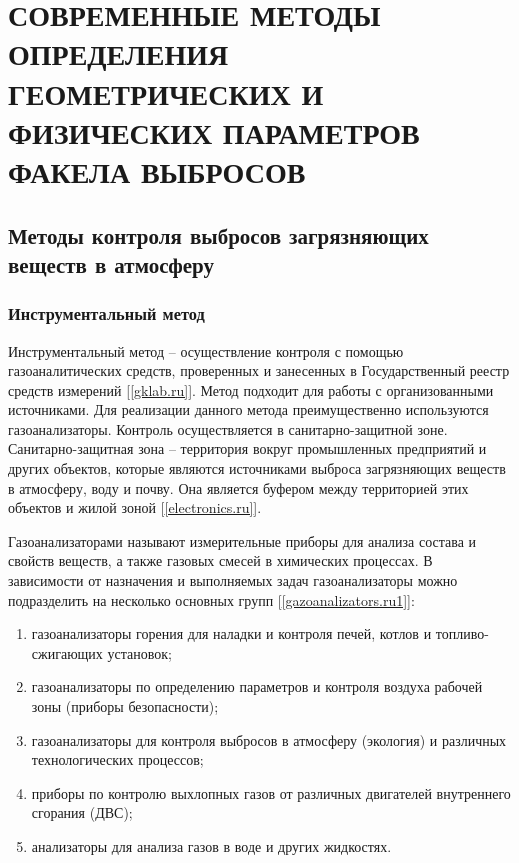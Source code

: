 \documentclass[14pt, a4paper]{extreport}
\begin{document}
	\chapter [\vspace*{-0.22cm}СОВРЕМЕННЫЕ МЕТОДЫ ОПРЕДЕЛЕНИЯ ГЕОМЕТРИЧЕСКИХ \hspace*{-0.5cm} И ФИЗИЧЕСКИХ ПАРАМЕТРОВ ФАКЕЛА ВЫБРОСОВ]{\vspace*{-0.22cm}СОВРЕМЕННЫЕ МЕТОДЫ ОПРЕДЕЛЕНИЯ ГЕОМЕТРИЧЕСКИХ И ФИЗИЧЕСКИХ ПАРАМЕТРОВ ФАКЕЛА ВЫБРОСОВ}
	\section {Методы контроля выбросов загрязняющих веществ в атмосферу}
	\subsection {Инструментальный метод}
	Инструментальный метод -- осуществление контроля с помощью газоаналитических средств, проверенных и занесенных в Государственный реестр средств измерений [\ref{gklab.ru}]. Метод подходит для работы с организованными источниками. Для реализации данного метода преимущественно используются газоанализаторы. Контроль осуществляется в санитарно-защитной зоне. Санитарно-защитная зона -- территория вокруг промышленных предприятий и других объектов, которые являются источниками выброса загрязняющих веществ в атмосферу, воду и почву. Она является буфером между территорией этих объектов и жилой зоной [\ref{electronics.ru}].
	
	Газоанализаторами называют измерительные приборы для анализа состава и свойств веществ, а также газовых смесей в химических процессах. В зависимости от назначения и выполняемых задач газоанализаторы можно подразделить на несколько основных групп [\ref{gazoanalizators.ru1}]:
	\begin{enumerate}[label={\arabic*)}]
		\item газоанализаторы горения для наладки и контроля печей, котлов и топливо-сжигающих установок;
		\item газоанализаторы по определению параметров и контроля воздуха рабочей зоны (приборы безопасности);
		\item газоанализаторы для контроля выбросов в атмосферу (экология) и различных технологических процессов;
		\item приборы по контролю выхлопных газов от различных двигателей внутреннего сгорания (ДВС);
		\item анализаторы для анализа газов в воде и других жидкостях.
	\end{enumerate}	
	
\end{document}
